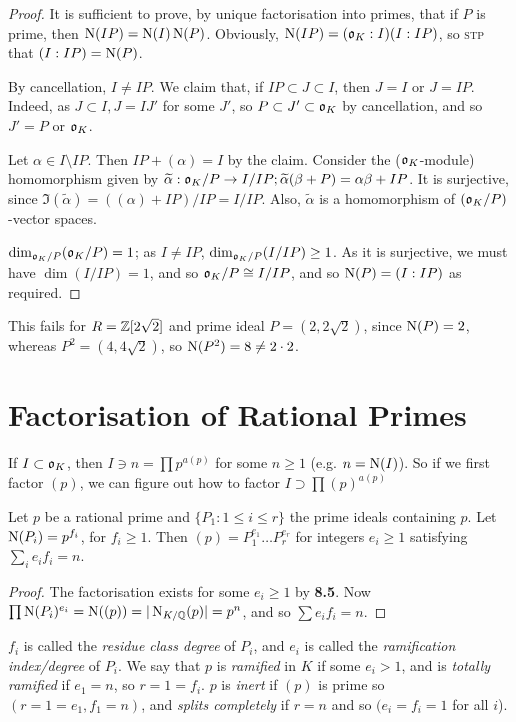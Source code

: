 \documentclass[10pt,a4paper]{article}
\begin{document}
\begin{proof}
It is sufficient to prove, by unique factorisation into primes, that if $P$ is prime, then $\operatorname{N}(IP)=\operatorname{N}(I)\operatorname{N}(P)$. Obviously, $\operatorname{N}(IP) = (\mathfrak{o}_K : I)(I:IP)$, so \textsc{stp} that $(I:IP) = \operatorname{N}(P)$. 

By cancellation, $I \neq IP$. We claim that, if $IP \subset J \subset I$, then $J = I$ or $J = IP$. Indeed, as $J \subset I, J = IJ'$ for some $J'$, so $P \subset J' \subset \mathfrak{o}_K$ by cancellation, and so $J' = P$ or $\mathfrak{o}_K$.

Let $\alpha \in I \setminus IP$. Then $IP + (\alpha) = I$ by the claim. Consider the ($\mathfrak{o}_K$-module) homomorphism given by $\widetilde{\alpha}: \mathfrak{o}_K/P \to I/IP; \widetilde{\alpha}(\beta+P) = \alpha\beta +IP$. It is surjective, since $\Im(\tilde{\alpha}) = ((\alpha) + IP)/IP = I/IP$. Also, $\tilde{\alpha}$ is a homomorphism of $(\mathfrak{o}_K/P)$-vector spaces.

$\dim_{\mathfrak{o}_K/P} (\mathfrak{o}_K/P) = 1$; as $I \neq IP$, $\dim_{\mathfrak{o}_K/P} ( I/IP) \geq 1$. As it is surjective, we must have $\dim(I/IP) = 1$, and so $\mathfrak{o}_K/P \cong I/IP$, and so $\operatorname{N}(P) = (I:IP)$ as required.
\end{proof}

This fails for $R = \mathbb{Z}[2\sqrt{2}]$ and prime ideal $P = (2, 2\sqrt{2})$, since $\operatorname{N}(P) = 2$, whereas $P^2 = (4, 4\sqrt{2})$, so $\operatorname{N}(P^2) = 8 \neq 2 \cdot 2$.

\section{Factorisation of Rational Primes}
If $I \subset \mathfrak{o}_K$, then $I \ni n = \prod p^{a(p)}$ for some $n \geq 1$ (e.g. $n = \operatorname{N}(I)$). So if we first factor $(p)$, we can figure out how to factor $I \supset \prod (p)^{a(p)}$

\begin{theorem}
Let $p$ be a rational prime and $\{P_1 : 1 \le i \leq r\}$ the prime ideals containing $p$. Let $\operatorname{N}(P_i) = p^{f_i}$, for $f_i \geq 1$. Then $(p) = P_1^{e_1} \ldots P_r^{e_r}$ for integers $e_i \geq 1$ satisfying $\sum_i e_i f_i = n$.
\end{theorem}
\begin{proof}
The factorisation exists for some $e_i \geq 1$ by \textbf{8.5}. Now $\prod \operatorname{N}(P_i)^{e_i} = \operatorname{N}((p)) = |\operatorname{N}_{K/\mathbb{Q}}(p)| = p^n$, and so $\sum e_i f_i = n$.
\end{proof}
$f_i$ is called the \emph{residue class degree} of $P_i$, and $e_i$ is called the \emph{ramification index/degree} of $P_i$. We say that $p$ is \emph{ramified} in $K$ if some $e_i >1$, and is \emph{totally ramified} if $e_1 = n$, so $r = 1 = f_i$. $p$ is \emph{inert} if $(p)$ is prime so $(r = 1 = e_1, f_1 = n)$, and \emph{splits completely} if $r = n$ and so $(e_i = f_i = 1$ for all $i$).
\end{document}
